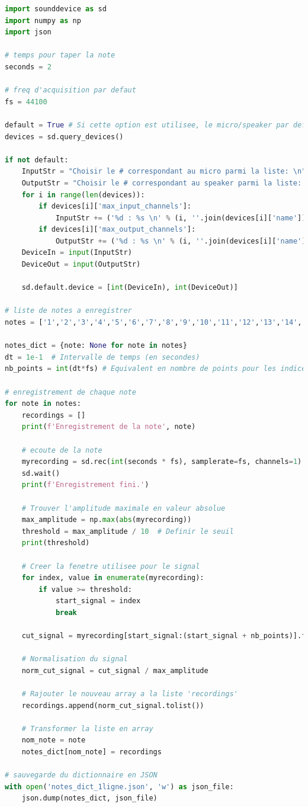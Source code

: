 ﻿\documentclass[11pt,letterpaper]{article}
\begin{document}
\begin{lstlisting}[language=python]
import sounddevice as sd
import numpy as np
import json

# temps pour taper la note
seconds = 2 

# freq d'acquisition par defaut
fs = 44100    

default = True # Si cette option est utilisee, le micro/speaker par defaut est utilise
devices = sd.query_devices()

if not default:
    InputStr = "Choisir le # correspondant au micro parmi la liste: \n"
    OutputStr = "Choisir le # correspondant au speaker parmi la liste: \n"
    for i in range(len(devices)):
        if devices[i]['max_input_channels']:
            InputStr += ('%d : %s \n' % (i, ''.join(devices[i]['name'])))
        if devices[i]['max_output_channels']:
            OutputStr += ('%d : %s \n' % (i, ''.join(devices[i]['name'])))
    DeviceIn = input(InputStr)
    DeviceOut = input(OutputStr)

    sd.default.device = [int(DeviceIn), int(DeviceOut)]

# liste de notes a enregistrer
notes = ['1','2','3','4','5','6','7','8','9','10','11','12','13','14','15','16','17']

notes_dict = {note: None for note in notes}
dt = 1e-1  # Intervalle de temps (en secondes)
nb_points = int(dt*fs) # Equivalent en nombre de points pour les indices

# enregistrement de chaque note
for note in notes:
    recordings = []
    print(f'Enregistrement de la note', note)

    # ecoute de la note
    myrecording = sd.rec(int(seconds * fs), samplerate=fs, channels=1)
    sd.wait()
    print(f'Enregistrement fini.')

    # Trouver l'amplitude maximale en valeur absolue
    max_amplitude = np.max(abs(myrecording))
    threshold = max_amplitude / 10  # Definir le seuil
    print(threshold)

    # Creer la fenetre utilisee pour le signal
    for index, value in enumerate(myrecording):
        if value >= threshold:
            start_signal = index
            break

    cut_signal = myrecording[start_signal:(start_signal + nb_points)].flatten()

    # Normalisation du signal
    norm_cut_signal = cut_signal / max_amplitude

    # Rajouter le nouveau array a la liste 'recordings'
    recordings.append(norm_cut_signal.tolist())

    # Transformer la liste en array
    nom_note = note
    notes_dict[nom_note] = recordings

# sauvegarde du dictionnaire en JSON
with open('notes_dict_1ligne.json', 'w') as json_file:
    json.dump(notes_dict, json_file)
\end{lstlisting}
\end{document}
